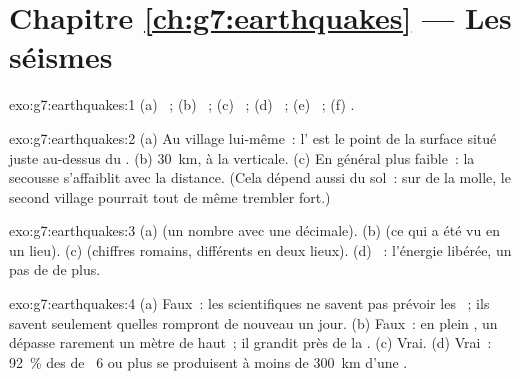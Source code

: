 \section*{Chapitre \ref{ch:g7:earthquakes} --- Les séismes}

\begin{solution}{exo:g7:earthquakes:1}
(a) ~; (b) ~; (c) ~; (d) ~; (e) ~;
(f) .
\end{solution}

\begin{solution}{exo:g7:earthquakes:2}
(a) Au village lui-même~: l' est le point de la surface situé
juste au-dessus du . (b) \qty{30}{km}, à la verticale. (c) En général
plus faible~: la secousse s'affaiblit avec la distance. (Cela dépend aussi
du sol~: sur de la  molle, le second village pourrait tout de même
trembler fort.)
\end{solution}

\begin{solution}{exo:g7:earthquakes:3}
(a)  (un nombre avec une décimale). (b)  (ce qui a été
vu en un lieu). (c)  (chiffres romains, différents en deux
lieux). (d) ~: l'énergie libérée, un pas de  de plus.
\end{solution}

\begin{solution}{exo:g7:earthquakes:4}
(a) Faux~: les scientifiques ne savent pas prévoir les ~; ils
savent seulement quelles  rompront de nouveau un jour. (b) Faux~:
en plein , un  dépasse rarement un mètre de haut~; il grandit
près de la . (c) Vrai. (d) Vrai~: 92~\% des  de ~6 ou
plus se produisent à moins de \qty{300}{km} d'une .
\end{solution}

